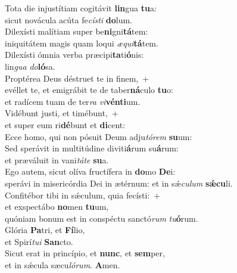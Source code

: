 \evenverse Tota die injustítiam cogitávit \textbf{lin}gua \textbf{tu}a:~\*\\
\evenverse sicut novácula acúta fe\textit{cí}\textit{sti} \textbf{do}lum.\\
\oddverse Dilexísti malítiam super be\textbf{ni}gni\textbf{tá}tem:~\*\\
\oddverse iniquitátem magis quam loqui \textit{æ}\textit{qui}\textbf{tá}tem.\\
\evenverse Dilexísti ómnia verba præcipi\textbf{ta}ti\textbf{ó}nis:~\*\\
\evenverse lin\textit{gua} \textit{do}\textbf{ló}sa.\\
\oddverse Proptérea Deus déstruet te in finem,~+\\
\oddverse  evéllet te, et emigrábit te de taber\textbf{ná}culo \textbf{tu}o:~\*\\
\oddverse et radícem tuam de ter\textit{ra} \textit{vi}\textbf{vén}\textbf{ti}um.\\
\evenverse Vidébunt justi, et timébunt,~+\\
\evenverse  et super eum ri\textbf{dé}bunt et \textbf{di}cent:~\*\\
\evenverse Ecce homo, qui non pósuit Deum adju\textit{tó}\textit{rem} \textbf{su}um:\\
\oddverse Sed sperávit in multitúdine diviti\textbf{á}rum su\textbf{á}rum:~\*\\
\oddverse et præváluit in vani\textit{tá}\textit{te} \textbf{su}a.\\
\evenverse Ego autem, sicut olíva fructífera in \textbf{do}mo \textbf{De}i:~\*\\
\evenverse sperávi in misericórdia Dei in ætérnum: et in sǽ\textit{cu}\textit{lum} \textbf{sǽ}\textbf{cu}li.\\
\oddverse Confitébor tibi in sǽculum, quia fecísti:~+\\
\oddverse  et exspectábo \textbf{no}men \textbf{tu}um,~\*\\
\oddverse quóniam bonum est in conspéctu sanctó\textit{rum} \textit{tu}\textbf{ó}rum.\\
\evenverse Glória \textbf{Pa}tri, et \textbf{Fí}lio,~\*\\
\evenverse et Spirí\textit{tu}\textit{i} \textbf{San}cto.\\
\oddverse Sicut erat in princípio, et \textbf{nunc}, et \textbf{sem}per,~\*\\
\oddverse et in sǽcula sæcu\textit{ló}\textit{rum}. \textbf{A}men.\\
